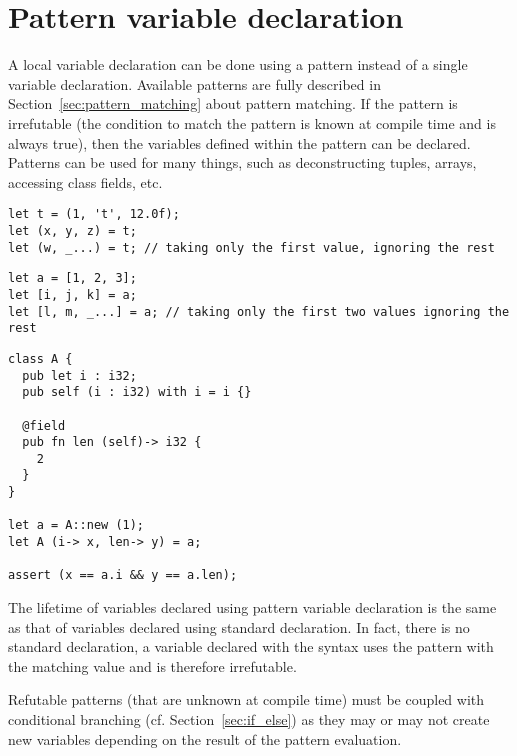 \section{Pattern variable declaration}
\label{sec:pattern_vdecl}

A local variable declaration can be done using a pattern instead of a single
variable declaration. Available patterns are fully described in
Section~\ref{sec:pattern_matching} about pattern matching. If the pattern is
irrefutable (the condition to match the pattern is known at compile time and is
always true), then the variables defined within the pattern can be declared.
Patterns can be used for many things, such as deconstructing tuples, arrays,
accessing class fields, etc.

\begin{lstlisting}[style=coloredverbatim, escapechar=@, caption=Tuple deconstruction]
let t = (1, 't', 12.0f);
let (x, y, z) = t;
let (w, _...) = t; // taking only the first value, ignoring the rest
\end{lstlisting}

\begin{lstlisting}[style=coloredverbatim, escapechar=@, caption=Array deconstruction]
let a = [1, 2, 3];
let [i, j, k] = a;
let [l, m, _...] = a; // taking only the first two values ignoring the rest
\end{lstlisting}

\begin{lstlisting}[style=coloredverbatim, caption=Class field access]
class A {
  pub let i : i32;
  pub self (i : i32) with i = i {}

  @field
  pub fn len (self)-> i32 {
    2
  }
}

let a = A::new (1);
let A (i-> x, len-> y) = a;

assert (x == a.i && y == a.len);
\end{lstlisting}

The lifetime of variables declared using pattern variable declaration is the
same as that of variables declared using standard declaration. In fact, there is
no standard declaration, a variable declared with the syntax  uses the pattern  with the matching value 
and is therefore irrefutable.

Refutable patterns (that are unknown at compile time) must be coupled with
conditional branching (cf. Section~\ref{sec:if_else}) as they may or may not
create new variables depending on the result of the pattern evaluation.

